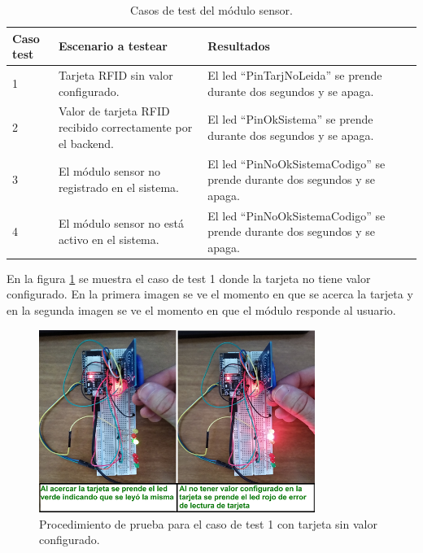 \begin{table}[h]
	\centering
	\caption[Casos de test del módulo sensor]{Casos de test del módulo sensor.}
	\begin{tabular}{p{1.5cm} p{5.5cm} p{5.5cm}} 	

		\toprule
		\textbf{Caso test} & 
		\textbf{Escenario a testear} & 
		\textbf{Resultados} 
		\\
		\midrule
1 & Tarjeta RFID sin valor configurado. & El led ``PinTarjNoLeida'' se prende durante dos segundos y se apaga. \\
2 & Valor de tarjeta RFID recibido correctamente por el backend.	& El led ``PinOkSistema'' se prende durante dos segundos y se apaga. \\
3 & El módulo sensor no registrado en el sistema. & El led ``PinNoOkSistemaCodigo'' se prende durante dos segundos y se apaga. \\
4 & El módulo sensor no está activo en el sistema. & El led ``PinNoOkSistemaCodigo'' se prende durante dos segundos y se apaga. \\	   
		\bottomrule
		\hline
	\end{tabular}
	\label{tab:tablaTestNodSensor}
\end{table}

En la figura \ref{fig:TestTajetaSinCodigo} se muestra el caso de test 1 donde la tarjeta no tiene valor configurado. En la primera imagen se ve el momento en que se acerca la tarjeta y en la segunda imagen se ve el momento en que el módulo responde al usuario.

\begin{figure}[ht]
	\centering
	\includegraphics[width=0.8\textwidth]{./Figures/TestTajetaSinCodigo.png}
	\caption{Procedimiento de prueba para el caso de test 1 con tarjeta sin valor configurado.}
	\label{fig:TestTajetaSinCodigo}
\end{figure}


